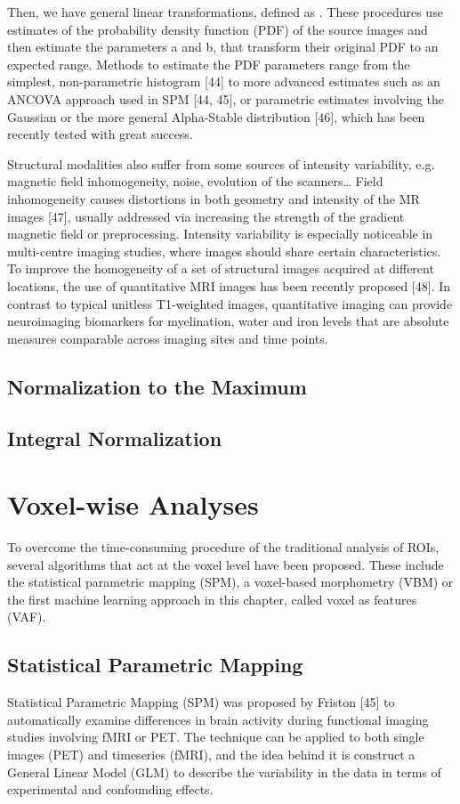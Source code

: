 Then, we have general linear transformations, defined as . These procedures use estimates of the probability density function (PDF) of the source images and then estimate the parameters a and b, that transform their original PDF to an expected range. Methods to estimate the PDF parameters range from the simplest, non-parametric histogram [44] to more advanced estimates such as an ANCOVA approach used in SPM [44, 45], or parametric estimates involving the Gaussian or the more general Alpha-Stable distribution [46], which has been recently tested with great success. 

Structural modalities also suffer from some sources of intensity variability, e.g. magnetic field inhomogeneity, noise, evolution of the scanners… Field inhomogeneity causes distortions in both geometry and intensity of the MR images [47], usually addressed via increasing the strength of the gradient magnetic field or preprocessing. Intensity variability is especially noticeable in multi-centre imaging studies, where images should share certain characteristics. To improve the homogeneity of a set of structural images acquired at different locations, the use of quantitative MRI images has been recently proposed [48]. In contrast to typical unitless T1-weighted images, quantitative imaging can provide neuroimaging biomarkers for myelination, water and iron levels that are absolute measures comparable across imaging sites and time points. 
\subsection{Normalization to the Maximum}
\subsection{Integral Normalization}

\section{Voxel-wise Analyses}\label{sec:vwanalyses}
To overcome the time-consuming procedure of the traditional analysis of ROIs, several algorithms that act at the voxel level have been proposed. These include the statistical parametric mapping (SPM), a voxel-based morphometry (VBM) or the first machine learning approach in this chapter, called voxel as features (VAF). 

\subsection{Statistical Parametric Mapping}
Statistical Parametric Mapping (SPM) was proposed by Friston [45] to automatically examine differences in brain activity during functional imaging studies involving fMRI or PET. The technique can be applied to both single images (PET) and timeseries (fMRI), and the idea behind it is construct a General Linear Model (GLM) to describe the variability in the data in terms of experimental and confounding effects. 

